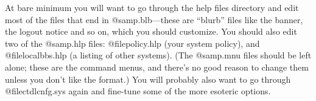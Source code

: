 At bare minimum you will want to go through the help files directory and
edit most of the files that end in @samp{.blb}---these are ``blurb'' files
like the banner, the logout notice and so on, which you should customize.
You should also edit two of the @samp{.hlp} files: @file{policy.hlp}
(your system policy), and @file{localbbs.hlp} (a listing of other systems).
(The @samp{.mnu} files should be left alone; these are the command menus,
and there's no good reason to change them unless you don't like the format.)
You will probably also want to go through @file{ctdlcnfg.sys} again and
fine-tune some of the more esoteric options.
